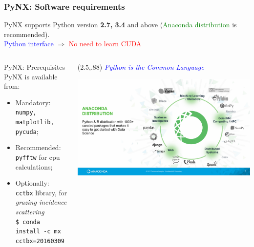 \documentclass[]{beamer}
\begin{document}

\begin{frame}[fragile]
\frametitle{PyNX: Software requirements}
PyNX supports Python version {\bf 2.7, 3.4} and above (\textcolor{green}{Anaconda distribution} is recommended).\\ 
\textcolor{blue}{Python interface} $\Rightarrow$ \textcolor{red}{No need to learn CUDA}

\begin{columns}
    \begin{column}{.7\textwidth}
              \hspace*{-1.5cm}
                \begin{block}{PyNX: Prerequisites}
        \small PyNX is available from:
\begin{itemize}
\item<1-> Mandatory: \texttt{numpy, matplotlib, pycuda};
\item<2-> Recommended\footnotemark: \texttt{pyfftw} for cpu calculations;
\item<3-> Optionally\footnotemark: \texttt{cctbx} library, for \textit{grazing incidence scattering} \\ 
\texttt{\$ conda install -c mx cctbx=20160309}
\end{itemize}
        \end{block}
    \end{column}
    \begin{column}{.3\textwidth}
            \begin{textblock}{5}(2.5,.88)
                \scriptsize\itshape{\textcolor{blue}{Python is the Common Language}}
            \end{textblock}
                \includegraphics[width=1.3\textwidth]
                {pics/anaconda_distribution}
    \end{column}
    \hspace*{.8cm}
\end{columns}
\end{frame}
\end{document}
